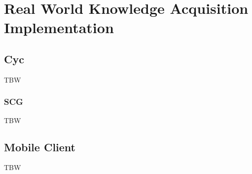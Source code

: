 % 
\chapter{Real World Knowledge Acquisition Implementation}

\section{Cyc}
\label{section:Cyc}

TBW

\subsection{SCG}
\label{section:scg}
TBW

\section{Mobile Client}
\label{section:app}
TBW

